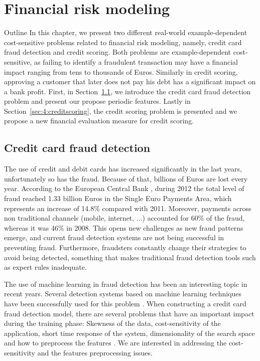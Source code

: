 \chapter{Financial risk modeling}\label{ch:4}

\begin{remark}{Outline}
In this chapter, we present two different real-world example-dependent 
cost-sensitive problems related to financial risk modeling, namely, credit card fraud detection and 
credit scoring. Both problems are example-dependent cost-sensitive, as failing to identify a 
fraudulent transaction may have a financial impact ranging from tens to thousands of Euros. 
Similarly in credit scoring, approving a customer that later does not pay his debt has a 
significant impact on a bank profit. First, in Section~\ref{sec:4:fraud},  we introduce the credit 
card fraud detection problem and present our propose periodic features.  Lastly in 
Section~\ref{sec:4:creditscoring}, the credit scoring problem is presented and we propose a new 
financial evaluation measure for credit scoring.
\end{remark}

\section{Credit card fraud detection}
\label{sec:4:fraud}

  The use of credit and debit cards has increased significantly   in the last years, unfortunately 
  so has the fraud. Because of that, billions of Euros are lost every year. According to 
  the European Central Bank \citep{EuropeanCentralBank2013}, during 2012 the total level of fraud 
  reached 1.33 billion Euros in the Single Euro Payments Area, which represents an increase of 
  14.8\% compared with 2011. Moreover, payments across non traditional channels (mobile, internet, 
  ...) accounted for 60\% of the fraud, whereas it was 46\% in 2008. This opens new challenges as 
  new fraud patterns emerge, and current fraud detection systems are not being successful in 
  preventing fraud. Furthermore, fraudsters constantly change their strategies to avoid being 
  detected, something that makes traditional fraud detection tools such as expert rules inadequate.
  
  The use of machine learning in fraud detection has been an interesting topic in recent years. 
  Several detection systems based on machine learning techniques have been successfully used 
  for this problem \citep{Bhattacharyya2011}. When constructing a credit card fraud detection 
  model, there are several problems that have an important impact during the training phase: 
  Skewness of the data, cost-sensitivity of the application, short time response of the system, 
  dimensionality  of the search space and how to preprocess the features
  \citep{Bolton2002,Gadi2008,Whitrow2008,DalPozzolo2014,VanVlasselaer2015a}.  We are interested 
  in addressing the cost-sensitivity and the features preprocessing   issues. 
  
